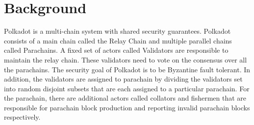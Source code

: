 \section{Background}

Polkadot is a multi-chain system with shared security guarantees.
Polkadot consists of a main chain called the Relay Chain and multiple parallel chains
 called Parachains.
A fixed set of actors called Validators are responsible to maintain the relay chain.
These validators need to vote on the consensus over all the parachains.
The security goal of Polkadot is to be Byzantine fault tolerant.
In addition, the validators are assigned to parachain by dividing the validators set into
random disjoint subsets that are each assigned to a particular parachain.
For the parachain, there are additional actors called collators and fishermen that are
responsible for parachain block production and reporting invalid parachain blocks respectively. 
